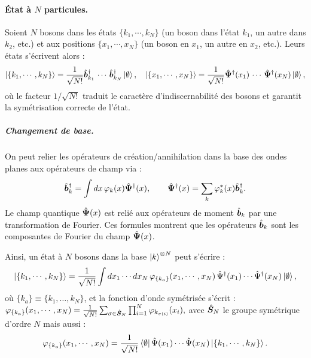 \paragraph{État à $N$ particules.} Soient $N$ bosons dans les états $\{ k_1 , \cdots , k_N \}$ (un boson dans l’état $k_1$, un autre dans $k_2$, etc.) et aux positions $\{ x_1 , \cdots , x_N \}$ (un boson en $x_1$, un autre en $x_2$, etc.). Leurs états s’écrivent alors :
\begin{eqnarray}
	\ket{ \{ k_1 , \cdots , k_N \}} = \frac{1}{\sqrt{N!}} \hat{\bm{b}}_{k_1}^\dag\, \cdots \, \hat{\bm{b}}_{k_N}^\dag \ket{\emptyset}, \quad \ket{\{x_1 , \cdots , x_N\}} = \frac{1}{\sqrt{N!}} \hat{\bm{\Psi}}^\dag(x_1)\, \cdots \, \hat{\bm{\Psi}}^\dag(x_N) \ket{\emptyset}	, \label{eq.chap.1.ket.N}
\end{eqnarray}
où le facteur \( 1/\sqrt{N!} \) traduit le caractère d’indiscernabilité des bosons et garantit la symétrisation correcte de l’état.

\subparagraph{Changement de base.}
On peut relier les opérateurs de création/annihilation dans la base des ondes planes aux opérateurs de champ via :
\begin{eqnarray}
	\hat{\bm{b}}_k^\dagger = \int dx \, \varphi_k(x) \hat{\bm{\Psi}}^\dagger(x), \qquad 
	\hat{\bm{\Psi}}^\dagger(x) = \sum_k \varphi_k^\ast(x)\hat{\bm{b}}_k^\dagger.\label{eq.chap.1.TF.1}
\end{eqnarray}
Le champ quantique $\hat{\bm{\Psi}}(x)$ est relié aux opérateurs de moment $\hat{\bm{b}}_k$ par une transformation de Fourier. Ces formules montrent que les opérateurs $\hat{\bm{b}}_{k}$ sont les composantes de Fourier du champ $\hat{\bm{\Psi}}(x)$.

Ainsi, un état à \(N\) bosons dans la base \( \ket{k}^{\otimes N} \) peut s’écrire :
\begin{eqnarray}
	\ket{\{k_1 , \cdots , k_N\}} = \frac{1}{\sqrt{N!}} \int dx_1 \cdots dx_N \, \varphi_{\{k_a\}} ( x_1 , \cdots , x_N ) \, \hat{\Psi}^\dag(x_1) \cdots \hat{\Psi}^\dag(x_N) \ket{\emptyset},
\end{eqnarray}
où \( \{k_a\} \equiv \{k_1, \dots, k_N\} \), et la fonction d’onde symétrisée s’écrit :
\(
	\varphi_{\{k_a\}} ( x_1 , \cdots , x_N ) = \frac{1}{\sqrt{N!}} \sum_{\sigma \in \hat{\bm{S}}_N } \prod_{i=1}^N \varphi_{k_{\sigma(i)}}(x_i),
\) 
avec $\hat{\bm{S}}_N $  le groupe symétrique d'ordre $N$ mais aussi :
\begin{eqnarray}
	\varphi_{\{k_a\}} ( x_1 , \cdots , x_N ) = \frac{1}{\sqrt{N!}} \bra{\emptyset} \hat{\Psi}(x_1) \cdots \hat{\Psi}(x_N) \ket{\{k_1, \cdots , k_N\}}.
\end{eqnarray}



